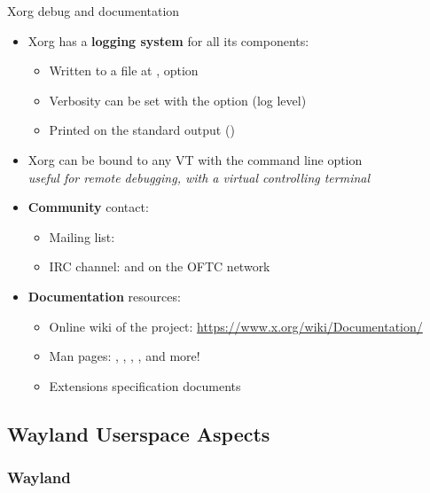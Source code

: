 \begin{frame}[fragile]{Xorg debug and documentation}
  \begin{itemize}
  \item Xorg has a \textbf{logging system} for all its components:
    \begin{itemize}
    \item Written to a file at ,  option
    \item Verbosity can be set with the  option (log level)
    \item Printed on the standard output ()
    \end{itemize}
  \item Xorg can be bound to any VT with the  command line option\\
    \textit{useful for remote debugging, with a virtual controlling terminal}
  \item \textbf{Community} contact:
    \begin{itemize}
    \item Mailing list: 
    \item IRC channel:  and  on the OFTC network
    \end{itemize}
  \item \textbf{Documentation} resources:
    \begin{itemize}
    \item Online wiki of the project: \url{https://www.x.org/wiki/Documentation/}
    \item Man pages: , , , ,  and more!
    \item Extensions specification documents
    \end{itemize}
  \end{itemize}
\end{frame}

\subsection{Wayland Userspace Aspects}

\subsubsection{Wayland}

